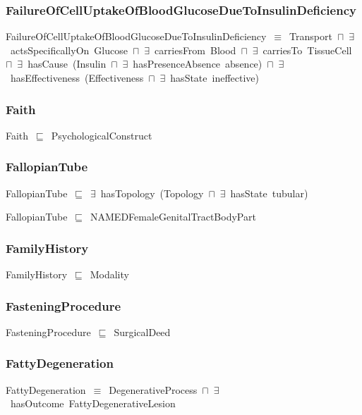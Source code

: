 \documentclass{article}
\begin{document}
\subsubsection*{FailureOfCellUptakeOfBloodGlucoseDueToInsulinDeficiency}

FailureOfCellUptakeOfBloodGlucoseDueToInsulinDeficiency~\ensuremath{\equiv}~Transport~\ensuremath{\sqcap}~\ensuremath{\exists}~actsSpecificallyOn~Glucose~\ensuremath{\sqcap}~\ensuremath{\exists}~carriesFrom~Blood~\ensuremath{\sqcap}~\ensuremath{\exists}~carriesTo~TissueCell~\ensuremath{\sqcap}~\ensuremath{\exists}~hasCause~(Insulin~\ensuremath{\sqcap}~\ensuremath{\exists}~hasPresenceAbsence~absence)~\ensuremath{\sqcap}~\ensuremath{\exists}~hasEffectiveness~(Effectiveness~\ensuremath{\sqcap}~\ensuremath{\exists}~hasState~ineffective)

\subsubsection*{Faith}

Faith~\ensuremath{\sqsubseteq}~PsychologicalConstruct~

\subsubsection*{FallopianTube}

FallopianTube~\ensuremath{\sqsubseteq}~\ensuremath{\exists}~hasTopology~(Topology~\ensuremath{\sqcap}~\ensuremath{\exists}~hasState~tubular)~

FallopianTube~\ensuremath{\sqsubseteq}~NAMEDFemaleGenitalTractBodyPart~

\subsubsection*{FamilyHistory}

FamilyHistory~\ensuremath{\sqsubseteq}~Modality~

\subsubsection*{FasteningProcedure}

FasteningProcedure~\ensuremath{\sqsubseteq}~SurgicalDeed~

\subsubsection*{FattyDegeneration}

FattyDegeneration~\ensuremath{\equiv}~DegenerativeProcess~\ensuremath{\sqcap}~\ensuremath{\exists}~hasOutcome~FattyDegenerativeLesion
\end{document}
